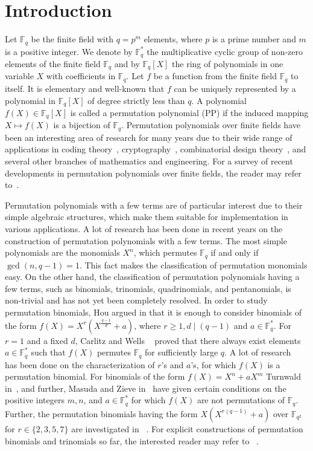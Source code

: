 \documentclass[12pt]{amsart}
\numberwithin{equation}{section}
\theoremstyle{definition}
\newcommand{\F}{\mathbb F}
\begin{document}
\section{Introduction}
Let $\F_q$ be the finite field with $q=p^m$ elements, where $p$ is a prime number and $m$ is a positive integer. We denote by $\F_q^*$ the multiplicative cyclic group of non-zero elements of the finite field $\F_q$ and by $\F_q[X]$ the ring of polynomials in one variable $X$ with coefficients in $\F_q$. Let $f$ be a function from the finite field $\F_q$ to itself. It is elementary and well-known that $f$ can be uniquely represented by a polynomial in $\F_q[X]$ of degree strictly less than $q$. A polynomial $f(X)\in \F_q[X]$ is called a permutation polynomial (PP) if the induced mapping $X \mapsto f(X)$ is a bijection of $\F_q$. Permutation polynomials over finite fields have been an interesting area of research for many years due to their wide range of applications in coding theory~\cite{ Ding_C_13, Chapuy_C_07}, cryptography~\cite{Bertoni_Daemen,  Dwokin_SHA3, Lidl_Cr_84, Schwenk_Cr_98}, combinatorial design theory~\cite{Ding_Co_06}, and several other branches of mathematics and engineering. For a survey of recent developments in permutation polynomials over finite fields, the reader may refer to~\cite{Hou_PP_15,WangIndex}.

Permutation polynomials with a few terms are of particular interest due to their simple algebraic structures,  which make them suitable for implementation in various applications. A lot of research has been done in recent years on the construction of permutation polynomials with a few terms. The most simple polynomials are the monomials $X^n$, which permutes $\F_q$ if and only if $\gcd(n,q-1)=1$. This fact makes the classification of permutation monomials easy.
On the other hand, the classification of permutation polynomials having a few terms, such as binomials, trinomials, quadrinomials, and pentanomials, is non-trivial and has not yet been completely resolved.
In order to study permutation binomials, Hou argued in \cite{Hou_bi_tri} that it is enough to consider binomials of the form $f(X)=X^r(X^{\frac{q-1}{d}}+a)$, where $ r \geq 1, d \mid (q-1)$ and $a\in \F_q^{*}$. For $r=1$ and a fixed $d$, Carlitz and Wells ~\cite{CW} proved that there always exist elements $a\in \F_q^*$ such that $f(X)$ permutes $\F_q$ for sufficiently large $q$. A lot of research~\cite{ JLTZ, WL,MZ,OM} has been done on the characterization of $r’$s and $a’$s, for which $f(X)$ is a permutation binomial. For  binomials of the form $f(X) = X^n +aX^m$ Turnwald in~\cite{TG}, and further, Masuda and Zieve in~\cite{MZ} have given certain conditions on the positive integers $m, n$, and $a \in \F_q^{*}$ for which $f(X)$ are not permutations of $\F_q$. Further, the permutation binomials having the form $X(X^{r(q-1)}+ a)$ over $\F_{q^2}$ for $r \in \{2,3,5,7\}$ are investigated in ~\cite{HXX,HL,LS}. For explicit constructions of permutation binomials and trinomials so far, the interested reader may refer to ~\cite{BZ,BS,SG,HV, LFW,LQ,Wang_2007}.
\end{document}
